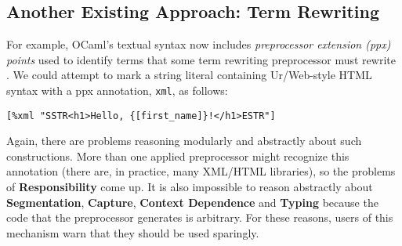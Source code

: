 \documentclass[acmsmall,10pt,review,anonymous]{acmart}\settopmatter{printfolios=true}
\newcommand{\li}[1]{\lstinline{#1}}
\begin{document}



\subsection{Another Existing Approach: Term Rewriting}
For example, OCaml's textual syntax now includes \emph{preprocessor extension (ppx) points} used to identify terms that some term rewriting preprocessor must rewrite \cite{ocaml-manual}. We could attempt to mark a string literal containing Ur/Web-style HTML syntax with a ppx annotation, \li{xml}, as follows:
\begin{lstlisting}[numbers=none]
  [%xml "SSTR<h1>Hello, {[first_name]}!</h1>ESTR"]
\end{lstlisting}
Again, there are problems reasoning modularly and abstractly about such constructions. More than one applied preprocessor might recognize this annotation (there are, in practice, many XML/HTML libraries), so the problems of \textbf{Responsibility} come up. It is also impossible to reason abstractly about \textbf{Segmentation}, \textbf{Capture}, \textbf{Context Dependence} and \textbf{Typing} because the code that the preprocessor generates is arbitrary. For these reasons, users of this mechanism warn that they should be used sparingly.
\end{document}
